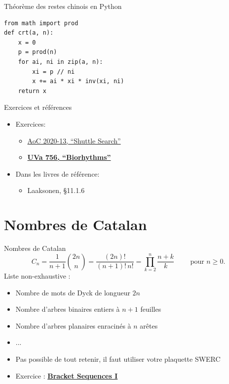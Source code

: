 \documentclass{main}
\begin{document}
\begin{frame}[fragile]{Théorème des restes chinois en Python}
    \begin{verbatim}
from math import prod
def crt(a, n):
    x = 0
    p = prod(n)
    for ai, ni in zip(a, n):
        xi = p // ni
        x += ai * xi * inv(xi, ni)
    return x
    \end{verbatim}
\end{frame}

\begin{frame}{Exercices et références}
    \begin{itemize}
        \item Exercices:
        \begin{itemize}
            \item \href{https://adventofcode.com/2020/day/13}{AoC 2020-13, “Shuttle Search”}
            \item \href{https://onlinejudge.org/index.php?option=onlinejudge&Itemid=8&page=show_problem&problem=697}{\textbf{UVa 756, “Biorhythms”}}
        \end{itemize}
        \item Dans les livres de référence:
        \begin{itemize}
            \item Laaksonen, §11.1.6
        \end{itemize}
    \end{itemize}
\end{frame}


\section{Nombres de Catalan}
\maketoc

\begin{frame}{Nombres de Catalan}
\vspace{-25pt}
\[
    C_n = \frac{1}{n+1}{2n\choose n} = \frac{(2n)!}{(n+1)!\,n!} = \prod\limits_{k=2}^{n}\frac{n+k}{k} \qquad\mbox{ pour }n\ge 0.
\]
\vspace{-15pt}
Liste non-exhaustive : 
\begin{itemize}
    \item Nombre de mots de Dyck de longueur $2n$
    \item Nombre d'arbres binaires entiers à $n + 1$ feuilles
    \item Nombre d'arbres planaires enracinés à $n$ arêtes
    \item ...
\end{itemize}

\begin{itemize}
    \item Pas possible de tout retenir, il faut utiliser votre plaquette SWERC 
    \item Exercice : \href{https://cses.fi/problemset/task/2064}{\textbf{Bracket Sequences I}} \\
\end{itemize}
\end{frame}
\end{document}
